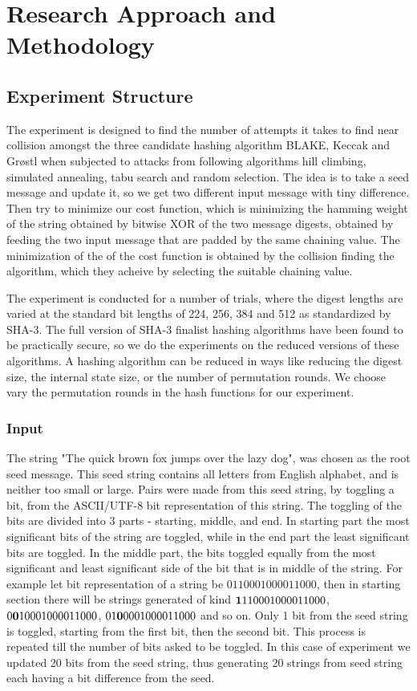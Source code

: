 \chapter{Research Approach and Methodology}

\section{Experiment Structure}

The experiment is designed to find the number of attempts it takes to find near collision amongst the three
candidate hashing algorithm BLAKE, Keccak and Gr{\o}stl when subjected to attacks from following algorithms
hill climbing, simulated annealing, tabu search and random selection. The idea is to take a seed message and
update it, so we get two different input message with tiny difference. Then try to minimize our cost function,
which is minimizing the hamming weight of the string obtained by bitwise XOR of the two message digests, 
obtained by feeding the two input message that are padded by the same chaining value. The minimization of the
of the cost function is obtained by the collision finding the algorithm, which they acheive by selecting
the suitable chaining value.

The experiment is conducted for a number of trials, where the digest lengths are varied at the standard bit
lengths of 224, 256, 384 and 512 as standardized by SHA-3. The full version of SHA-3 finalist hashing algorithms
have been found to be practically secure, so we do the experiments on the reduced versions of these algorithms.
A hashing algorithm can be reduced in ways like reducing the digest size, the internal state size, or the
number of permutation rounds. We choose vary the permutation rounds in the hash functions for our experiment.

\subsection{Input}

The string "The quick brown fox jumps over the lazy dog", was chosen as the root seed message. This seed string
contains all letters from English alphabet, and is neither too small or large. Pairs were made from this seed
string, by toggling a bit, from the ASCII/UTF-8 bit representation of this string. The toggling of the bits are
divided into 3 parts - starting, middle, and end. In starting part the most significant bits of the string are
toggled, while in the end part the least significant bits are toggled. In the middle part, the bits toggled 
equally from the most significant and least significant side of the bit that is in middle of the string. For
example let bit representation of a string be $01100010 00011000$, then in starting section there will be strings
generated of kind ${\bf 1}1100010 00011000$, $0{\bf 0}100010 00011000$, $01{\bf 0}00010 00011000$ and so on. 
Only 1 bit from the seed string is toggled, starting from the first bit, then the second bit. This process is
repeated till the number of bits asked to be toggled. In this case of experiment we updated 20 bits from the
seed string, thus generating 20 strings from seed string each having a bit difference from the seed.

